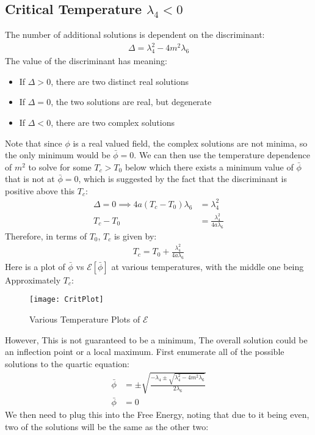 \documentclass[12pt]{article}
\begin{document}
\subsection{Critical Temperature $\lambda_4<0$}
The number of additional solutions is dependent on the discriminant:
\begin{align*}
  \Delta=\lambda_4^2-4m^2\lambda_6
\end{align*}
The value of the discriminant has meaning:
\begin{itemize}
\item If $\Delta>0$, there are two distinct real solutions
\item If $\Delta=0$, the two solutions are real, but degenerate
\item If $\Delta<0$, there are two complex solutions
\end{itemize}
Note that since $\phi$ is a real valued field, the complex solutions are not minima, so the only minimum would be $\bar\phi=0$. We can then use the temperature dependence of $m^2$ to solve for some $T_c>T_0$ below which there exists a minimum value of $\bar\phi$ that is not at $\bar\phi=0$, which is suggested by the fact that the discriminant is positive above this $T_c$:
\begin{align*}
  \Delta=0\implies4a(T_c-T_0)\lambda_6&=\lambda_4^2\\
  T_c-T_0&=\frac{\lambda_4^2}{4a\lambda_6}
\end{align*}
Therefore, in terms of $T_0$, $T_c$ is given by:
\begin{align}
  \boxed{T_c=T_0+\frac{\lambda_4^2}{4a\lambda_6}}
\end{align}
Here is a plot of $\bar\phi$ vs $\mathcal{E}[\bar\phi]$ at various temperatures, with the middle one being Approximately $T_c$:
\begin{figure}[H]
  \centering
  \texttt{[image: CritPlot]}
  \caption{Various Temperature Plots of $\mathcal{E}$}
\end{figure}
However, This is not guaranteed to be a minimum, The overall solution could be an inflection point or a local maximum. First enumerate all of the possible solutions to the quartic equation:
\begin{align*}
  \bar\phi&=
  \pm\sqrt{\frac{-\lambda_4\pm\sqrt{\lambda_4^2-4m^2\lambda_6}}{2\lambda_6}}\\
  \bar\phi&=0
\end{align*}
We then need to plug this into the Free Energy, noting that due to it being even, two of the solutions will be the same as the other two:
\end{document}
